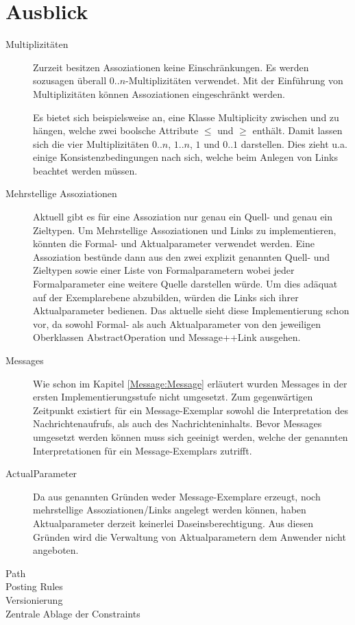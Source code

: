 \section{Ausblick}



\begin{description}
  \item[Multiplizitäten] Zurzeit besitzen Assoziationen keine Einschränkungen. 
Es werden sozusagen überall $0..n$-Multiplizitäten verwendet. 
Mit der Einführung von Multiplizitäten können Assoziationen eingeschränkt werden.
 
Es bietet sich beispielsweise an, eine Klasse Multiplicity zwischen  und  zu hängen,
welche zwei boolsche Attribute $\leq$ und $\geq$ enthält. 
Damit lassen sich die vier Multiplizitäten $0..n$, $1..n$, $1$ und $0..1$ darstellen.
Dies zieht u.a. einige Konsistenzbedingungen nach sich, welche beim Anlegen von Links beachtet werden müssen. 
  \item[Mehrstellige Assoziationen] Aktuell gibt es für eine Assoziation nur genau ein Quell- und genau ein Zieltypen. Um Mehrstellige Assoziationen und Links zu implementieren, könnten die Formal- und Aktualparameter verwendet werden. Eine Assoziation bestünde dann aus den zwei explizit genannten Quell- und Zieltypen sowie einer Liste von Formalparametern wobei jeder Formalparameter eine weitere Quelle darstellen würde. Um dies adäquat auf der Exemplarebene abzubilden, würden die Links sich ihrer Aktualparameter bedienen. Das aktuelle \MM sieht diese Implementierung schon vor, da sowohl Formal- als auch Aktualparameter von den jeweiligen Oberklassen AbstractOperation und Message++Link ausgehen.
  \item[Messages] Wie schon im Kapitel \ref{Message:Message} erläutert wurden Messages in der ersten Implementierungsstufe nicht umgesetzt. Zum gegenwärtigen Zeitpunkt existiert für ein Message-Exemplar sowohl die Interpretation des Nachrichtenaufrufs, als auch des Nachrichteninhalts.
Bevor Messages umgesetzt werden können muss sich geeinigt werden, welche der genannten Interpretationen für ein Message-Exemplars zutrifft. 
  \item[ActualParameter] Da aus genannten Gründen weder Message-Exemplare erzeugt, noch mehrstellige Assoziationen/Links angelegt werden können, haben Aktualparameter derzeit keinerlei Daseinsberechtigung. Aus diesen Gründen wird die Verwaltung von Aktualparametern dem Anwender nicht angeboten.
  \item[Path]
  \item[Posting Rules]
  \item[Versionierung]
  \item[Zentrale Ablage der Constraints]
\end{description}
  